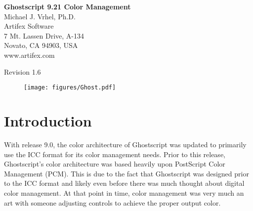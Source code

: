 \documentclass[12pt,notitlepage]{article}
\begin{document}
\begin{titlepage}

\begin{center}{\huge \bf Ghostscript 9.21 Color Management\\} \vspace{0.5in} {\Large Michael J.
Vrhel, Ph.D.\\} {\Large Artifex Software\\} {\Large 7 Mt. Lassen Drive, A-134\\} {\Large Novato, CA 94903, USA\\}
{\Large www.artifex.com\\}
\end{center}
\vspace*{0.5in}
\begin{abstract}
This document provides information about the color architecture in Ghostscript 9.21. The document is suitable for users who wish to
obtain accurate color with their output device as well as for developers who wish to customize Ghostscript to achieve a higher
level of control and/or interface with a different color management module.
\end{abstract}
\begin{center}
\vspace*{0.25in}
Revision 1.6
\vspace*{0.25in}
\capstartfalse
\begin{figure}[h]
    \begin{center}
\texttt{[image: figures/Ghost.pdf]}
    \end{center}
\end{figure}
\capstarttrue

\end{center}

\end{titlepage}

\renewcommand{\baselinestretch}{1.67}\normalsize

\clearpage

\singlespace

\section{Introduction}

With release 9.0, the color architecture of Ghostscript was updated to primarily use the ICC\cite{ICC} format for its color management needs.  Prior to this release, Ghostscript's color architecture was based heavily upon PostScript\cite{PS} Color Management (PCM).  This is due to the fact that Ghostscript was designed prior to the ICC format and likely even before there was much thought about digital color management.  At that point in time, color management was very much an art with someone adjusting controls to achieve the proper output color.
\end{document}
